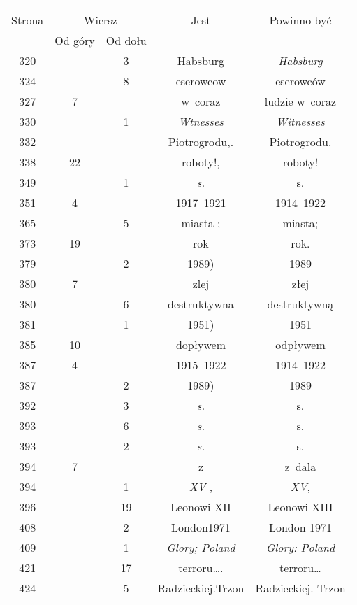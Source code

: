 \documentclass[a4paper,11pt]{article}
\begin{document}
\begin{center}
  \begin{tabular}{|c|c|c|c|c|}
    \hline
    & \multicolumn{2}{c|}{} & & \\
    Strona & \multicolumn{2}{c|}{Wiersz} & Jest
                              & Powinno być \\ \cline{2-3}
    & Od góry & Od dołu & & \\
    \hline
    320 & &  3 & Habsburg & \textit{Habsburg} \\
    324 & &  8 & eserowcow & eserowców \\
    327 &  7 & & w~coraz & ludzie w~coraz \\
    330 & &  1 & \textit{Wtnesses} & \textit{Witnesses} \\
    332 & & & Piotrogrodu,. & Piotrogrodu. \\ %
    338 & 22 & & roboty!, & roboty! \\
    349 & &  1 & \textit{s.} & s. \\
    351 &  4 & & 1917--1921 & 1914--1922 \\
    365 & &  5 & miasta ; & miasta; \\
    373 & 19 & & rok & rok. \\
    379 & &  2 & 1989) & 1989 \\
    380 &  7 & & zlej & złej \\
    380 & &  6 & destruktywna & destruktywną \\
    381 & &  1 & 1951) & 1951 \\
    385 & 10 & & dopływem & odpływem \\
    387 &  4 & & 1915--1922 & 1914--1922 \\
    387 & &  2 & 1989) & 1989 \\
    392 & &  3 & \textit{s.} & s. \\
    393 & &  6 & \textit{s.} & s. \\
    393 & &  2 & \textit{s.} & s. \\
    394 &  7 & & z & z~dala \\
    394 & &  1 & \textit{XV} , & \textit{XV}, \\
    396 & & 19 & Leonowi XII & Leonowi XIII \\
    408 & &  2 & London1971 & London 1971 \\
    409 & &  1 & \textit{Glory; Poland} & \textit{Glory: Poland} \\
    421 & & 17 & terroru\ldots. & terroru\ldots \\
    424 & &  5 & Radzieckiej.Trzon & Radzieckiej. Trzon \\

\end{tabular}
\end{center}
\end{document}
